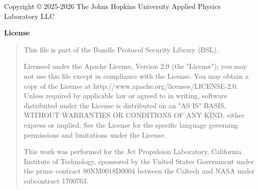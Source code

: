 \let\mypdfximage\pdfximage\def\pdfximage{\immediate\mypdfximage}\documentclass[twoside]{book}
\newcommand{\+}{\discretionary{\mbox{\scriptsize$\hookleftarrow$}}{}{}}
\newcommand{\clearemptydoublepage}{%
  \newpage{\pagestyle{empty}\cleardoublepage}%
}
\begin{document}
\raggedbottom

\hypersetup{pageanchor=false,
             bookmarksnumbered=true,
             pdfencoding=unicode
            }


\begin{titlepage}
\vspace*{7cm}
\begin{center}%
{\Large $projectbrief \\[1ex]\large $projectnumber }\\
\vspace*{1cm}
{\large  Prepared by The Johns Hopkins Applied Physics Laboratory}\\
\vspace*{1cm}
{\large Generated by Doxygen $doxygenversion}\\
\end{center}
\end{titlepage}

\noindent Copyright \textnormal{\copyright} 2025-2026 The Johns Hopkins University Applied Physics Laboratory LLC
\noindent\begin{center}\small\bfseries License \end{center}
\begin{quote}\small
This file is part of the Bundle Protocol Security Library (BSL).

Licensed under the Apache License, Version 2.0 (the "License"); you may not use this file except in compliance with the License.
You may obtain a copy of the License at http://www.apache.org/licenses/LICENSE-2.0. Unless required by applicable law or
agreed to in writing, software distributed under the License is distributed on an "AS IS" BASIS, WITHOUT WARRANTIES OR
CONDITIONS OF ANY KIND, either express or implied. See the License for the specific language governing permissions and
limitations under the License.

This work was performed for the Jet Propulsion Laboratory, California Institute of Technology, sponsored by the United States Government under the prime contract 80NM0018D0004 between the Caltech and NASA under subcontract 1700763.
\end{quote}

\clearemptydoublepage
\tableofcontents

\clearemptydoublepage
{}
\hypersetup{pageanchor=true}

\end{document}
